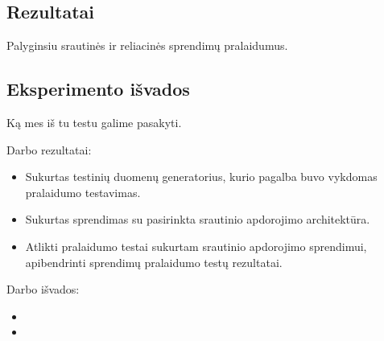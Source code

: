 \documentclass{VUMIFPSkursinis}
\begin{document}
\subsection{Rezultatai}

Palyginsiu srautinės ir reliacinės sprendimų pralaidumus.

\subsection{Eksperimento išvados}

Ką mes iš tu testu galime pasakyti.

Darbo rezultatai:
\begin{itemize}
    \item Sukurtas testinių duomenų generatorius, kurio pagalba buvo vykdomas pralaidumo testavimas.
    \item Sukurtas sprendimas su pasirinkta srautinio apdorojimo architektūra.
    \item Atlikti pralaidumo testai sukurtam srautinio apdorojimo sprendimui, apibendrinti sprendimų pralaidumo testų rezultatai.
\end{itemize}

Darbo išvados:
\begin{itemize}
\item 
\item
\end{itemize}

\printbibliography[heading=bibintoc] 
\end{document}
